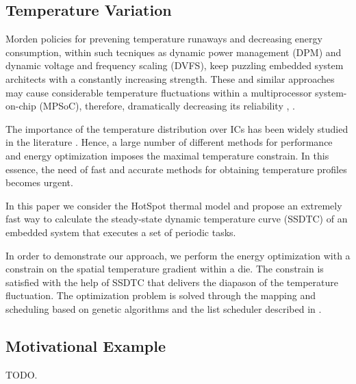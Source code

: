 \subsection{Temperature Variation}
Morden policies for prevening temperature runaways and decreasing energy consumption, within such tecniques as dynamic power management (DPM) and dynamic voltage and frequency scaling (DVFS), keep puzzling embedded system architects with a constantly increasing strength. These and similar approaches may cause considerable temperature fluctuations within a multiprocessor system-on-chip (MPSoC), therefore, dramatically decreasing its reliability \cite{mihic2004}, \cite{simunic2005}.

The importance of the temperature distribution over ICs has been widely studied in the literature \cite{lu2004}. Hence, a large number of different methods for performance and energy optimization imposes the maximal temperature constrain. In this essence, the need of fast and accurate methods for obtaining temperature profiles becomes urgent.

In this paper we consider the HotSpot thermal model \cite{huang2006} and propose an extremely fast way to calculate the steady-state dynamic temperature curve (SSDTC) of an embedded system that executes a set of periodic tasks.

In order to demonstrate our approach, we perform the energy optimization with a constrain on the spatial temperature gradient within a die. The constrain is satisfied with the help of SSDTC that delivers the diapason of the temperature fluctuation. The optimization problem is solved through the mapping and scheduling based on genetic algorithms and the list scheduler described in \cite{schmitz2004}.

\subsection{Motivational Example}
TODO.
